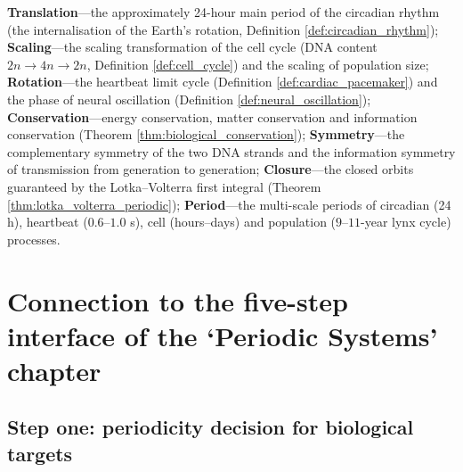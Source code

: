 \begin{remark}\label{rem:bio_seven_themes}
\textbf{Translation}---the approximately 24-hour main period of the circadian rhythm (the internalisation of the Earth's rotation, Definition \ref{def:circadian_rhythm}); \textbf{Scaling}---the scaling transformation of the cell cycle (DNA content $2n \to 4n \to 2n$, Definition \ref{def:cell_cycle}) and the scaling of population size; \textbf{Rotation}---the heartbeat limit cycle (Definition \ref{def:cardiac_pacemaker}) and the phase of neural oscillation (Definition \ref{def:neural_oscillation}); \textbf{Conservation}---energy conservation, matter conservation and information conservation (Theorem \ref{thm:biological_conservation}); \textbf{Symmetry}---the complementary symmetry of the two DNA strands and the information symmetry of transmission from generation to generation; \textbf{Closure}---the closed orbits guaranteed by the Lotka--Volterra first integral (Theorem \ref{thm:lotka_volterra_periodic}); \textbf{Period}---the multi-scale periods of circadian (24 h), heartbeat ($0.6$--$1.0$ s), cell (hours--days) and population ($9$--$11$-year lynx cycle) processes.
\end{remark}

\section{Connection to the five-step interface of the `Periodic Systems' chapter}
\label{sec:bio_five_steps}

\subsection{Step one: periodicity decision for biological targets}

